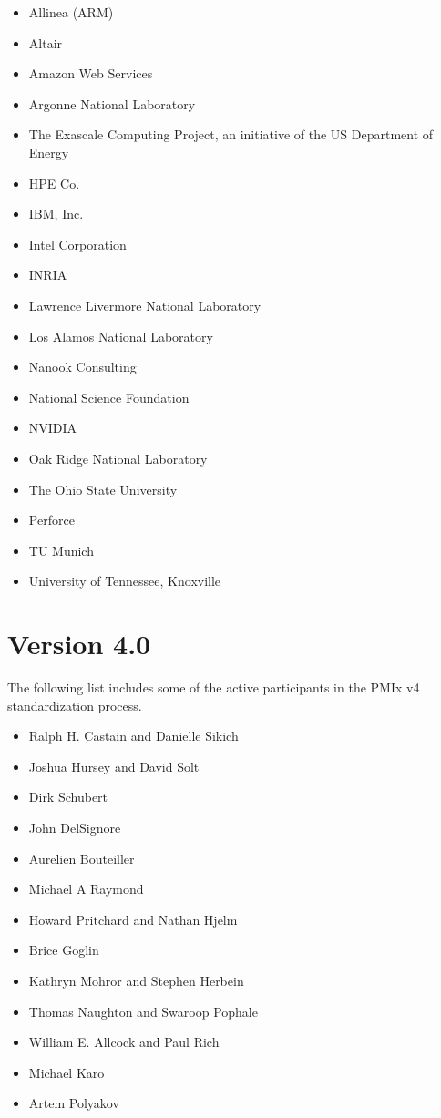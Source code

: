 \begin{itemize}
    \item Allinea (ARM) %
    \item Altair
    \item Amazon Web Services
    \item Argonne National Laboratory
    \item The Exascale Computing Project, an initiative of the US Department of Energy
    \item HPE Co.
    \item IBM, Inc.
    \item Intel Corporation
    \item INRIA
    \item Lawrence Livermore National Laboratory
    \item Los Alamos National Laboratory
    \item Nanook Consulting
    \item National Science Foundation
    \item NVIDIA
    \item Oak Ridge National Laboratory
    \item The Ohio State University
    \item Perforce %
    \item TU Munich
    \item University of Tennessee, Knoxville
\end{itemize}

\section{Version 4.0}

The following list includes some of the active participants in the PMIx v4 standardization process.

\begin{itemize}
\item Ralph H. Castain and Danielle Sikich
\item Joshua Hursey and David Solt
\item Dirk Schubert
\item John DelSignore
\item Aurelien Bouteiller
\item Michael A Raymond
\item Howard Pritchard and Nathan Hjelm
\item Brice Goglin
\item Kathryn Mohror and Stephen Herbein
\item Thomas Naughton and Swaroop Pophale
\item William E. Allcock and Paul Rich
\item Michael Karo
\item Artem Polyakov
\end{itemize}

